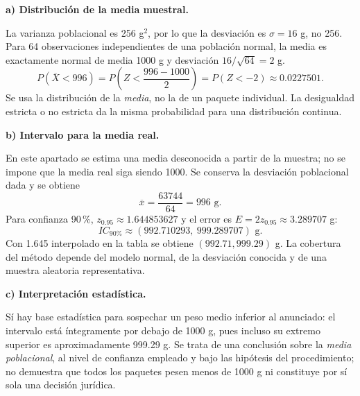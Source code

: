 \textbf{a) Distribución de la media muestral.}\par\nopagebreak[4]
La varianza poblacional es 256 g$^2$, por lo que la desviación es $\sigma=16$ g, no 256. Para 64 observaciones independientes de una población normal, la media es exactamente normal de media 1000 g y desviación $16/\sqrt{64}=2$ g.
\[
P(\overline X<996)=P\left(Z<\frac{996-1000}{2}\right)
=P(Z<-2)\approx\boxed{0.0227501}.
\]
Se usa la distribución de la \emph{media}, no la de un paquete individual. La desigualdad estricta o no estricta da la misma probabilidad para una distribución continua.

\textbf{b) Intervalo para la media real.}\par\nopagebreak[4]
En este apartado se estima una media desconocida a partir de la muestra; no se impone que la media real siga siendo 1000. Se conserva la desviación poblacional dada y se obtiene
\[
\overline x=\frac{63744}{64}=996\text{ g}.
\]
Para confianza 90\,\%, $z_{0.95}\approx1.644853627$ y el error es $E=2z_{0.95}\approx3.289707$ g:
\[
\boxed{IC_{\text{90\%}}\approx(992.710293,\ 999.289707)\text{ g}.}
\]
Con 1.645 interpolado en la tabla se obtiene $(992.71,999.29)$ g. La cobertura del método depende del modelo normal, de la desviación conocida y de una muestra aleatoria representativa.

\textbf{c) Interpretación estadística.}\par\nopagebreak[4]
Sí hay base estadística para sospechar un peso medio inferior al anunciado: el intervalo está íntegramente por debajo de 1000 g, pues incluso su extremo superior es aproximadamente 999.29 g. Se trata de una conclusión sobre la \emph{media poblacional}, al nivel de confianza empleado y bajo las hipótesis del procedimiento; no demuestra que todos los paquetes pesen menos de 1000 g ni constituye por sí sola una decisión jurídica.
